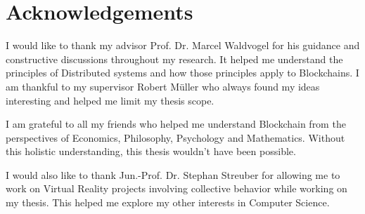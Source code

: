 \chapter{Acknowledgements}
	I would like to thank my advisor Prof. Dr. Marcel Waldvogel for his guidance and constructive discussions throughout my research. It helped me understand the principles of Distributed systems and how those principles apply to Blockchains. I am thankful to my supervisor Robert Müller who always found my ideas interesting and helped me limit my thesis scope.
	
	I am grateful to all my friends who helped me understand Blockchain from the perspectives of Economics, Philosophy, Psychology and Mathematics. Without this holistic understanding, this thesis wouldn't have been possible.
	
	I would also like to thank Jun.-Prof. Dr. Stephan Streuber for allowing me to work on Virtual Reality projects involving collective behavior while working on my thesis. This helped me explore my other interests in Computer Science.